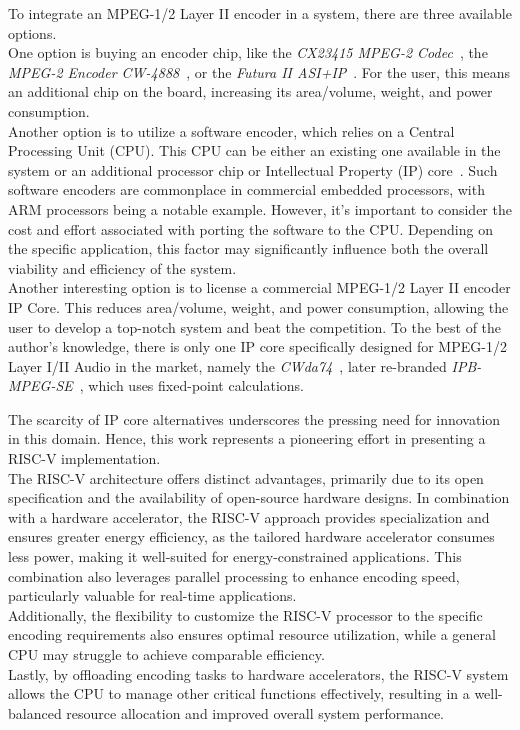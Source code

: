 To integrate an MPEG-1/2 Layer II encoder in a system, there are three available options.\\
One option is buying an encoder chip, like the \textit{CX23415 MPEG-2 Codec}~\cite{cx23415}, the \textit{MPEG-2 Encoder CW-4888}~\cite{cw4888}, or the \textit{Futura II ASI+IP}~\cite{futura}. For the user, this means an additional chip on the board, increasing its area/volume, weight, and power consumption. \\
Another option is to utilize a software encoder, which relies on a Central Processing Unit (CPU). This CPU can be either an existing one available in the system or an additional processor chip or Intellectual Property (IP) core~\cite{ipcore}. Such software encoders are commonplace in commercial embedded processors, with ARM processors being a notable example. However, it's important to consider the cost and effort associated with porting the software to the CPU. Depending on the specific application, this factor may significantly influence both the overall viability and efficiency of the system.\\
Another interesting option is to license a commercial MPEG-1/2 Layer II encoder IP Core. This reduces area/volume, weight, and power consumption, allowing the user to develop a top-notch system and beat the competition. To the best of the author's knowledge, there is only one IP core specifically designed for MPEG-1/2 Layer I/II Audio in the market, namely the \textit{CWda74}~\cite{CWda74}, later re-branded \textit{IPB-MPEG-SE}~\cite{ipb-mpeg-se}, which uses fixed-point calculations. 


The scarcity of IP core alternatives underscores the pressing need for innovation in this domain. Hence, this work represents a pioneering effort in presenting a RISC-V implementation. \\
The RISC-V architecture offers distinct advantages, primarily due to its open specification and the availability of open-source hardware designs. In combination with a hardware accelerator, the RISC-V approach provides specialization and ensures greater energy efficiency, as the tailored hardware accelerator consumes less power, making it well-suited for energy-constrained applications. This combination also leverages parallel processing to enhance encoding speed, particularly valuable for real-time applications. \\
Additionally, the flexibility to customize the RISC-V processor to the specific encoding requirements also ensures optimal resource utilization, while a general CPU may struggle to achieve comparable efficiency.\\
Lastly, by offloading encoding tasks to hardware accelerators, the RISC-V system allows the CPU to manage other critical functions effectively, resulting in a well-balanced resource allocation and improved overall system performance. 


